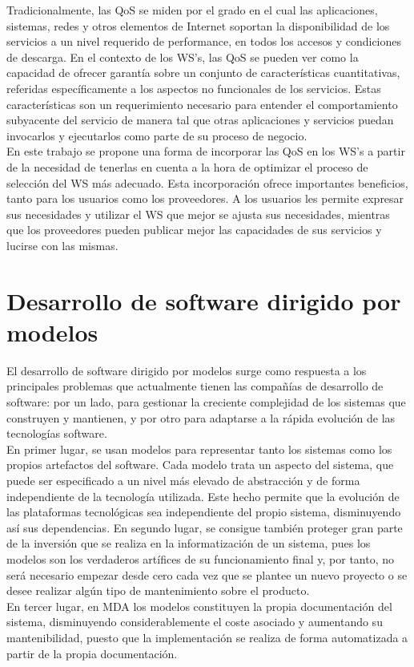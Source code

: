 Tradicionalmente, las QoS se miden por el grado en el cual las aplicaciones, sistemas, redes y otros elementos de Internet soportan la disponibilidad de los servicios a un nivel requerido de performance, en todos los accesos y condiciones de descarga. En el contexto de los WS's, las QoS se pueden ver como la capacidad de ofrecer garantía sobre un conjunto de características cuantitativas, referidas específicamente a los aspectos no funcionales de los servicios. Estas características son un requerimiento necesario para entender el comportamiento subyacente del servicio de manera tal que otras aplicaciones y servicios puedan invocarlos y ejecutarlos como parte de su proceso de negocio.\\

En este trabajo se propone una forma de incorporar las QoS en los WS's a partir de la necesidad de tenerlas en cuenta a la hora de optimizar el proceso de selección del WS más adecuado. Esta incorporación ofrece importantes beneficios, tanto para los usuarios como los proveedores. A los usuarios les permite expresar sus necesidades y utilizar el WS que mejor se ajusta sus necesidades, mientras que los proveedores pueden publicar mejor las capacidades de sus servicios y lucirse con las mismas.

\section{Desarrollo de software dirigido por modelos}
\label{Desarrollo de software dirigido por modelos}

El desarrollo de software dirigido por modelos surge como respuesta a los principales problemas que actualmente tienen las compañías de desarrollo de software: por un lado, para gestionar la creciente complejidad de los sistemas que construyen y mantienen, y por otro para adaptarse a la rápida evolución de las tecnologías software.\\
En primer lugar, se usan modelos para representar tanto los sistemas como los propios artefactos del software. Cada modelo trata un aspecto del sistema, que puede ser especificado a un nivel más elevado de abstracción y de forma independiente de la tecnología utilizada. Este hecho permite que la evolución de las plataformas tecnológicas sea independiente del propio sistema, disminuyendo así sus dependencias.
En segundo lugar, se consigue también proteger gran parte de la inversión que se realiza en la informatización de un sistema, pues los modelos son los verdaderos artífices de su funcionamiento final y, por tanto, no será necesario empezar desde cero cada vez que se plantee un nuevo proyecto o se desee realizar algún tipo de mantenimiento sobre el producto.\\
En tercer lugar, en MDA los modelos constituyen la propia documentación del sistema, disminuyendo considerablemente el coste asociado y aumentando su mantenibilidad, puesto que la implementación se realiza de forma automatizada a partir de la propia documentación.

